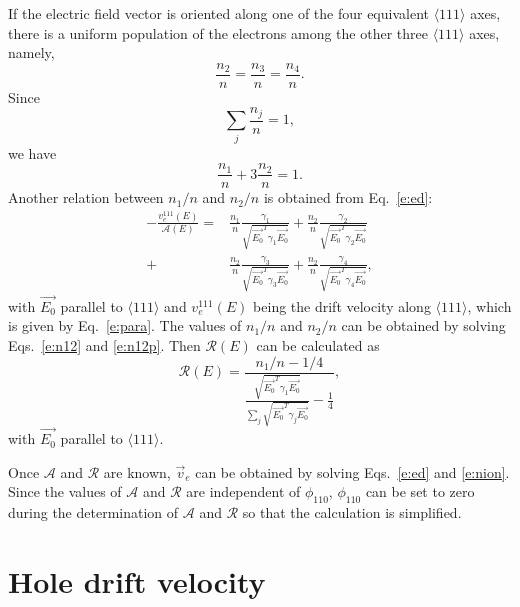 \documentclass[epj]{svjour}
\begin{document}
\begin{appendices}
If the electric field vector is oriented along one of the four
equivalent $\langle 111 \rangle$ axes, there is a uniform population
of the electrons among the other three $\langle 111 \rangle$ axes,
namely,
\begin{equation} 
\label{e:n111} 
\frac{n_{2}}{n} = \frac{n_{3}}{n} = \frac{n_{4}}{n}. 
\end{equation} 
Since 
\begin{equation} 
\label{e:nsum} 
\displaystyle \sum_{j}\frac{n_{j}}{n} = 1, 
\end{equation} 
we have 
\begin{equation} 
\label{e:n12} 
\frac{n_{1}}{n} + 3\frac{n_{2}}{n}= 1. 
\end{equation} 
Another relation between $n_{1}/n$ and $n_{2}/n$ is obtained from
Eq.~\ref{e:ed}:
\begin{equation} 
\label{e:n12p} 
\begin{split}
- \frac{v_{e}^{111}(E)}{\mathcal{A}(E)} = &
\frac{n_{1}}{n} \frac{\gamma_{1}} 
{\sqrt{\vec{E_{0}}^{T}\gamma_{1}\vec{E_{0}}}} +
\frac{n_{2}}{n} \frac{\gamma_{2}}         
{\sqrt{\vec{E_{0}}^{T}\gamma_{2}\vec{E_{0}}}} \\ + &
\frac{n_{2}}{n} \frac{\gamma_{3}}         
{\sqrt{\vec{E_{0}}^{T}\gamma_{3}\vec{E_{0}}}} +  
\frac{n_{2}}{n} \frac{\gamma_{4}}         
{\sqrt{\vec{E_{0}}^{T}\gamma_{4}\vec{E_{0}}}}, 
\end{split}
\end{equation}
with $\vec{E_{0}}$ parallel to $\langle 111 \rangle$ and
$v_{e}^{111}(E)$ being the drift velocity along $\langle 111 \rangle$,
which is given by Eq.~\ref{e:para}. The values of $n_{1}/n$ and
$n_{2}/n$ can be obtained by solving Eqs.~\ref{e:n12} and
\ref{e:n12p}. Then $\mathcal{R}(E)$ can be calculated as
\begin{equation} 
\label{e:re} 
\mathcal{R}(E) = \frac{n_{1}/n - 1/4}
{\displaystyle \frac{\sqrt{\vec{E_{0}}^{T}\gamma_{1}\vec{E_{0}}}}
{\sum_{j}\sqrt{\vec{E_{0}}^{T}\gamma_{j}\vec{E_{0}}}} - 
\frac{1}{4}},
\end{equation} 
with $\vec{E_{0}}$ parallel to $\langle 111 \rangle$.

Once $\mathcal{A}$ and $\mathcal{R}$ are known, $\vec{v}_{e}$ can be
obtained by solving Eqs.~\ref{e:ed} and \ref{e:nion}. Since the values
of $\mathcal{A}$ and $\mathcal{R}$ are independent of $\phi_{110}$,
$\phi_{110}$ can be set to zero during the determination of
$\mathcal{A}$ and $\mathcal{R}$ so that the calculation is simplified.

\section{Hole drift velocity} 
\label{s:hole} 
\setcounter{equation}{0}
\renewcommand{\theequation}{B.\arabic{equation}}
\setcounter{figure}{0}
\renewcommand{\thefigure}{B.\arabic{figure}}


\end{appendices}
\end{document}
